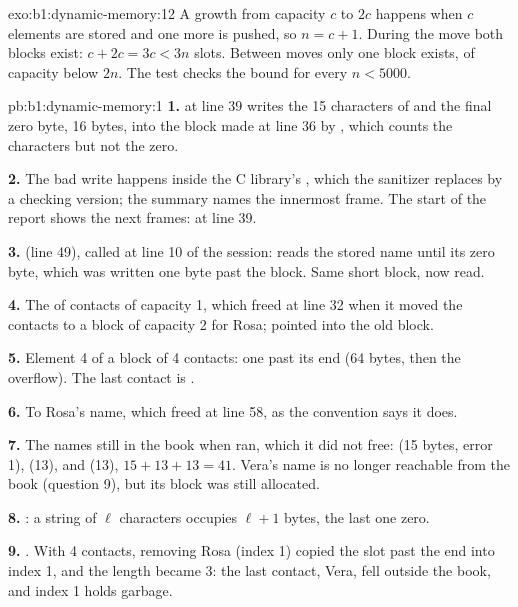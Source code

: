 \begin{solution}{exo:b1:dynamic-memory:12}
A growth from capacity $c$ to $2c$ happens when $c$ elements are stored and one more is pushed, so $n = c + 1$. During
the move both blocks exist: $c + 2c = 3c < 3n$ slots. Between moves only one block exists, of capacity below $2n$. The
test  checks the bound for every $n < 5000$.
\end{solution}

\begin{solution}{pb:b1:dynamic-memory:1}
\textbf{1.}  at line 39 writes the 15 characters of  and the final zero byte, 16
bytes, into the block made at line 36 by , which counts the characters but not the zero.

\textbf{2.} The bad write happens inside the C library's , which the sanitizer replaces by a checking
version; the summary names the innermost frame. The start of the report shows the next frames:  at line
39.

\textbf{3.}  (line 49), called at line 10 of the session:  reads the stored name until its
zero byte, which was written one byte past the block. Same short block, now read.

\textbf{4.} The  of contacts of capacity 1, which  freed at line 32 when it moved the contacts to a
block of capacity 2 for Rosa;  pointed into the old block.

\textbf{5.} Element 4 of a block of 4 contacts: one past its end (64 bytes, then the overflow). The last contact is
.

\textbf{6.} To Rosa's name, which  freed at line 58, as the convention says it does.

\textbf{7.} The names still in the book when  ran, which it did not free:  (15
bytes, error 1),  (13), and  (13), $15 + 13 + 13 = 41$. Vera's name is no longer
reachable from the book (question 9), but its block was still allocated.

\textbf{8.} : a string of $\ell$ characters occupies $\ell + 1$ bytes, the last one zero.

\textbf{9.} . With 4 contacts, removing Rosa (index 1) copied the slot past
the end into index 1, and the length became 3: the last contact, Vera, fell outside the book, and index 1 holds garbage.


\end{solution}
